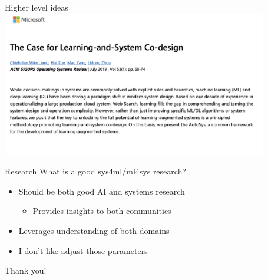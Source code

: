 \documentclass[UTF8]{beamer}
\begin{document}
\begin{frame}{Higher level ideas}
  \includegraphics[height=180pt]{figure/co_design.png}
\end{frame}

\begin{frame}{Research}
  What is a good sys4ml/ml4sys research?
  \begin{itemize}
    \item<2-> Should be both good AI and systems research
      \begin{itemize}
        \item<3-> Provides insights to both communities
      \end{itemize}
    \item<4-> Leverages understanding of both domains
    \item<5-> I don't like adjust those parameters
  \end{itemize}
\end{frame}

\begin{frame}
  \Huge{\centerline{Thank you!}}
\end{frame}
\end{document}

